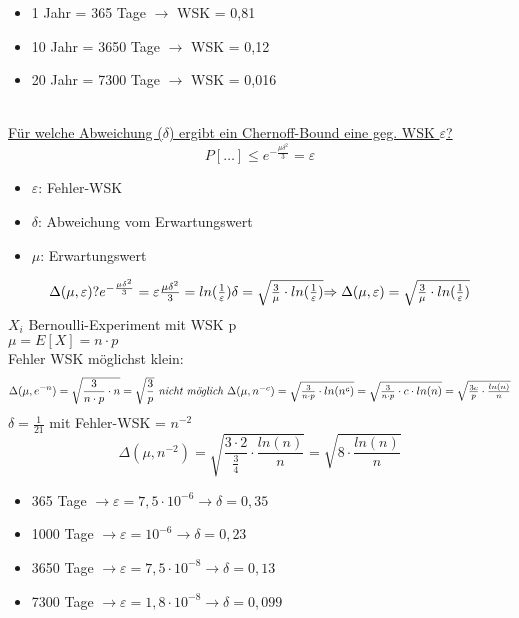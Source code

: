 \documentclass{article}
\begin{document}
	\begin{itemize}
		 \item 1 Jahr = 365 Tage $\rightarrow$ WSK = 0,81
		 \item 10 Jahr = 3650 Tage $\rightarrow$ WSK = 0,12
		 \item 20 Jahr = 7300 Tage $\rightarrow$ WSK = 0,016
	\end{itemize}
	\newpage
	\hfill \\
	\underline{Für welche Abweichung ($\delta$) ergibt ein Chernoff-Bound eine geg. WSK $\varepsilon$?}
	\[
		P[\ldots] \leq e^{-\frac{\mu \delta ^2}{3}} = \varepsilon
	\]
	\begin{itemize}
		\item $\varepsilon$: Fehler-WSK
		\item $\delta$: Abweichung vom Erwartungswert
		\item $\mu$: Erwartungswert
	\end{itemize}
	\[
		\Delta (\mu , \varepsilon) ? $$ $$
		e^{-\frac{\mu \delta ^2}{3}} = \varepsilon $$ $$
		\frac{\mu \delta ^2}{3} = ln(\frac{1}{\varepsilon}) $$ $$
		\delta = \sqrt{\frac{3}{\mu} \cdot ln(\frac{1}{\varepsilon})} $$ $$
		\Rightarrow \Delta(\mu , \varepsilon) = \sqrt{\frac{3}{\mu} \cdot ln(\frac{1}{\varepsilon})} 
	\]
	$X_i$ Bernoulli-Experiment mit WSK p \\
	$\mu = E[X] = n \cdot p$ \\
	Fehler WSK möglichst klein: \\
	\[
		\Delta (\mu , e^{-n} ) = \sqrt{\frac{3}{n\cdot p} \cdot n} = \sqrt{\frac{3}{p}} \textit{ nicht möglich } $$ $$
		\Delta (\mu , n^{-c} ) = \sqrt{\frac{3}{n\cdot p} \cdot ln(n^c)} = \sqrt{\frac{3}{n\cdot p} \cdot c \cdot ln(n)} = \sqrt{\frac{3c}{p} \cdot \frac{ln(n)}{n}}
	\]
	$\delta = \frac{1}{21}$ mit Fehler-WSK = $n^{-2}$ \\
	\[
	 \Delta(\mu , n^{-2}) = \sqrt{\frac{3\cdot 2}{\frac{3}{4}} \cdot \frac{ln(n)}{n}} = \sqrt{8 \cdot \frac{ln(n)}{n}}
	\]
	\begin{itemize}
		\item 365 Tage $\rightarrow \varepsilon= 7,5 \cdot 10^{-6} \rightarrow \delta = 0,35$
		\item 1000 Tage $\rightarrow \varepsilon= 10^{-6} \rightarrow \delta = 0,23$
		\item 3650 Tage $\rightarrow \varepsilon= 7,5 \cdot 10^{-8} \rightarrow \delta = 0,13$
		\item 7300 Tage $\rightarrow \varepsilon= 1,8 \cdot 10^{-8} \rightarrow \delta = 0,099$
	\end{itemize}
\end{document}

